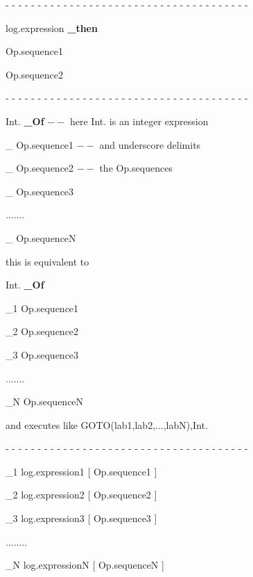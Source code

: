 - - - - - - - - - - - - - - - - - - - - - - - - - - - - - - - - - - - - - -

 log.expression {\bf \_then}

\qquad \qquad Op.sequence1


\qquad \qquad  Op.sequence2


- - - - - - - - - - - - - - - - - - - - - - - - - - - - - - - - - - - - - -

 Int. {\bf \_Of} \qquad \quad
$--$ here Int. is an integer expression

\quad \qquad  \_ Op.sequence1  \qquad $--$ and underscore delimits

\quad \qquad \_ Op.sequence2  \qquad $--$ the Op.sequences

\quad \qquad \_ Op.sequence3

\qquad \quad    .......

\qquad \quad \_ Op.sequenceN


\par\noindent this is equivalent to

 Int. {\bf \_Of}

\qquad \quad \_1 Op.sequence1

\qquad \quad \_2 Op.sequence2

\qquad \quad \_3 Op.sequence3

\qquad \quad   .......

\qquad \quad \_N Op.sequenceN


\par\noindent and executes like GOTO(lab1,lab2,...,labN),Int.

- - - - - - - - - - - - - - - - - - - - - - - - - - - - - - - - - - - - - -


\qquad \quad \_1 log.expression1 [ Op.sequence1 ]

\qquad \quad \_2 log.expression2 [ Op.sequence2 ]

\qquad \quad \_3 log.expression3 [ Op.sequence3 ]

\qquad \quad   ........

\qquad \quad \_N log.expressionN [ Op.sequenceN ]



